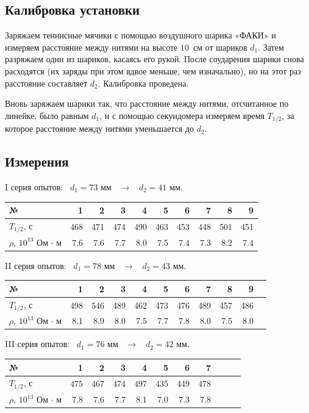 \documentclass[a4paper, 12pt]{article}
\begin{document}
\subsection*{Калибровка установки}
Заряжаем теннисные мячики с помощью воздушного шарика «ФАКИ» и измеряем расстояние между нитями на высоте $10$~см от шариков $d_1$. Затем разряжаем один из шариков, касаясь его рукой. После соударения шарики снова расходятся (их заряды при этом вдвое меньше, чем изначально), но на этот раз расстояние составляет $d_2$. Калибровка проведена.

Вновь заряжаем шарики так, что расстояние между нитями, отсчитанное по линейке, было равным $d_1$, и с помощью секундомера измеряем время $T_{1/2}$, за которое расстояние между нитями уменьшается до $d_2$.


\subsection*{Измерения}

I серия опытов:~ $d_1 = 73$ мм ~$\longrightarrow$~ $d_2 = 41$ мм.

\begin{tabular}{|l|r|r|r|r|r|r|r|r|r|}
\hline
№ & 1 & 2 & 3 & 4 & 5 & 6 & 7 & 8 & 9 \\
\hline
$T_{1/2}$, с & 468 & 471 & 474 & 490 & 463 & 453 & 448 & 501 & 451 \\
\hline
$\rho$, $10^{13}$ Ом $\cdot$ м & 7.6 & 7.6 & 7.7 & 8.0 & 7.5 & 7.4 & 7.3 & 8.2 & 7.4\\
\hline
\end{tabular}

\clearpage

II серия опытов:~ $d_1 = 78$ мм ~$\longrightarrow$~ $d_2 = 43$ мм.

\begin{tabular}{|l|r|r|r|r|r|r|r|r|r|r|}
\hline
№ & 1 & 2 & 3 & 4 & 5 & 6 & 7 & 8 & 9 \\
\hline
$T_{1/2}$, с & 498 & 546  & 489 & 462 & 473 & 476 & 489 & 457 & 486  \\
\hline
$\rho$, $10^{13}$ Ом $\cdot$ м & 8.1 & 8.9 & 8.0 & 7.5 & 7.7 & 7.8 & 8.0 & 7.5 & 8.0\\
\hline
\end{tabular}

\bigskip

III серия опытов:~ $d_1 = 76$ мм ~$\longrightarrow$~ $d_2 = 42$ мм.

\begin{tabular}{|l|r|r|r|r|r|r|r|r|r|r|}
\hline
№ & 1 & 2 & 3 & 4 & 5 & 6 & 7 \\
\hline
$T_{1/2}$, с & 475  & 467 & 474 & 497  & 435 & 449 & 478  \\
\hline
$\rho$, $10^{13}$ Ом $\cdot$ м & 7.8 & 7.6 & 7.7 & 8.1 & 7.0  & 7.3 & 7.8\\
\hline
\end{tabular}
\end{document}
